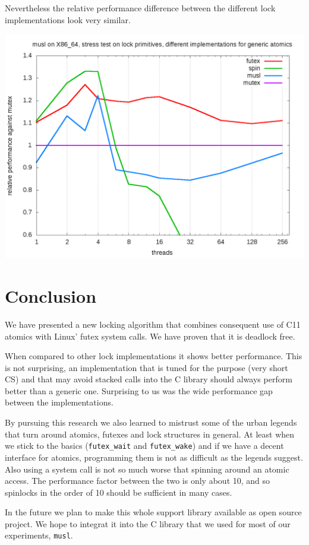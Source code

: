 Nevertheless the relative performance difference between the
different lock implementations look very similar.

\begin{center}
\includegraphics[width=0.95\linewidth]{benchs/x86_64/test-x86_64-musl-relative.png}
\end{center}

\section{Conclusion}
\label{sec-5}

We have presented a new locking algorithm that combines consequent use
of C11 atomics with Linux' futex system calls. We have proven that it
is deadlock free.

When compared to other lock implementations it shows better
performance. This is not surprising, an implementation that is tuned
for the purpose (very short CS) and that may avoid stacked calls into
the C library should always perform better than a generic one.
Surprising to us was the wide performance gap between the
implementations.

By pursuing this research we also learned to mistrust some of the
urban legends that turn around atomics, futexes and lock structures in
general. At least when we stick to the basics (\texttt{futex\_wait} and
\texttt{futex\_wake}) and if we have a decent interface for atomics,
programming them is not as difficult as the legends suggest. Also
using a system call is not so much worse that spinning around an
atomic access. The performance factor between the two is only about
10, and so spinlocks in the order of 10 should be sufficient in many
cases.

In the future we plan to make this whole support library available as
open source project. We hope to integrat it into the C library that we
used for most of our experiments, \texttt{musl}.


